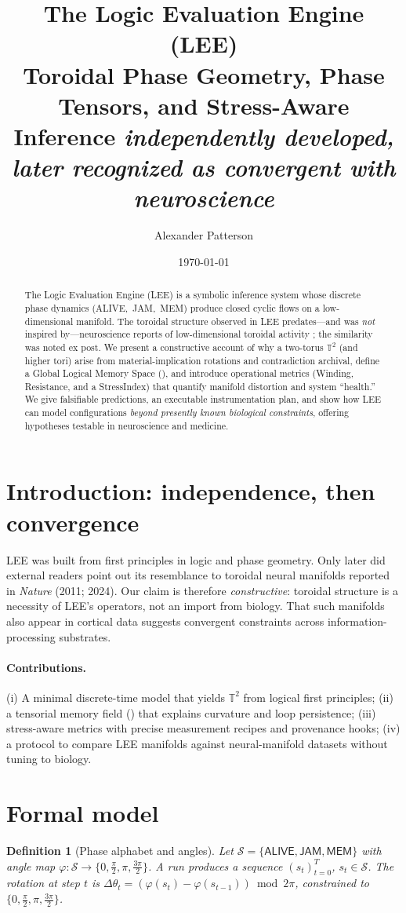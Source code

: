 \documentclass[11pt]{article}
\title{\textbf{The Logic Evaluation Engine (LEE)}\\
\large Toroidal Phase Geometry, Phase Tensors, and Stress-Aware Inference \emph{independently developed, later recognized as convergent with neuroscience}}
\author{Alexander Patterson}
\date{\today}
\newtheorem{definition}{Definition}
\newcommand{\Alive}{\textsf{ALIVE}}
\newcommand{\Jam}{\textsf{JAM}}
\newcommand{\Mem}{\textsf{MEM}}
\newcommand{\T}{\mathbb{T}}
\newcommand{\GLMS}{\mathrm{GLMS}}
\begin{document}
\maketitle

\begin{abstract}
The Logic Evaluation Engine (LEE) is a symbolic inference system whose discrete phase dynamics (\Alive,\ \Jam,\ \Mem) produce closed cyclic flows on a low-dimensional manifold.
The toroidal structure observed in LEE predates---and was \emph{not} inspired by---neuroscience reports of low-dimensional toroidal activity \citep{Nature_2011,Nature_2024}; the similarity was noted ex post.
We present a constructive account of why a two-torus $\T^2$ (and higher tori) arise from material-implication rotations and contradiction archival, define a Global Logical Memory Space (\GLMS), and introduce operational metrics (Winding, Resistance, and a StressIndex) that quantify manifold distortion and system ``health.''
We give falsifiable predictions, an executable instrumentation plan, and show how LEE can model configurations \emph{beyond presently known biological constraints}, offering hypotheses testable in neuroscience and medicine.
\end{abstract}

\section{Introduction: independence, then convergence}
LEE was built from first principles in logic and phase geometry. Only later did external readers point out its resemblance to toroidal neural manifolds reported in \emph{Nature} (2011; 2024).
Our claim is therefore \emph{constructive}: toroidal structure is a necessity of LEE's operators, not an import from biology. That such manifolds also appear in cortical data suggests convergent constraints across information-processing substrates.

\paragraph{Contributions.}
(i) A minimal discrete-time model that yields $\T^2$ from logical first principles; (ii) a tensorial memory field (\GLMS) that explains curvature and loop persistence; (iii) stress-aware metrics with precise measurement recipes and provenance hooks; (iv) a protocol to compare LEE manifolds against neural-manifold datasets without tuning to biology.

\section{Formal model}
\begin{definition}[Phase alphabet and angles]
Let $\mathcal{S}=\{\Alive,\Jam,\Mem\}$ with angle map $\varphi:\mathcal{S}\!\to\!\{0,\tfrac{\pi}{2},\pi,\tfrac{3\pi}{2}\}$.
A run produces a sequence $(s_t)_{t=0}^T$, $s_t\in\mathcal{S}$.
The rotation at step $t$ is $\Delta\theta_t=(\varphi(s_t)-\varphi(s_{t-1}))\bmod 2\pi$, constrained to $\{0,\tfrac{\pi}{2},\pi,\tfrac{3\pi}{2}\}$.
\end{definition}
\end{document}
